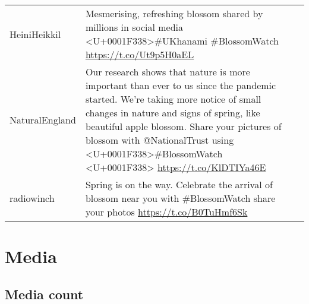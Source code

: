 \documentclass[
]{article}
\begin{document}
\begin{longtable}[]{@{}llr@{}}
\begin{minipage}[t]{0.23\columnwidth}\raggedright
HeiniHeikkil\strut
\end{minipage} & \begin{minipage}[t]{0.42\columnwidth}\raggedright
Mesmerising, refreshing blossom shared by millions in social media
\textless U+0001F338\textgreater\#UKhanami \#BlossomWatch
\url{https://t.co/Ut9p5H0aEL}\strut
\end{minipage} & \begin{minipage}[t]{0.18\columnwidth}\raggedleft
2\strut
\end{minipage}\tabularnewline
\begin{minipage}[t]{0.23\columnwidth}\raggedright
NaturalEngland\strut
\end{minipage} & \begin{minipage}[t]{0.42\columnwidth}\raggedright
Our research shows that nature is more important than ever to us since
the pandemic started. We're taking more notice of small changes in
nature and signs of spring, like beautiful apple blossom. Share your
pictures of blossom with @NationalTrust using
\textless U+0001F338\textgreater\#BlossomWatch
\textless U+0001F338\textgreater{} \url{https://t.co/KlDTIYa46E}\strut
\end{minipage} & \begin{minipage}[t]{0.18\columnwidth}\raggedleft
2\strut
\end{minipage}\tabularnewline
\begin{minipage}[t]{0.23\columnwidth}\raggedright
radiowinch\strut
\end{minipage} & \begin{minipage}[t]{0.42\columnwidth}\raggedright
Spring is on the way. Celebrate the arrival of blossom near you with
\#BlossomWatch share your photos \url{https://t.co/B0TuHmf6Sk}\strut
\end{minipage} & \begin{minipage}[t]{0.18\columnwidth}\raggedleft
2\strut
\end{minipage}\tabularnewline
\bottomrule
\end{longtable}

\hypertarget{media}{%
\section{Media}\label{media}}

\hypertarget{media-count}{%
\subsection{Media count}\label{media-count}}
\end{document}
